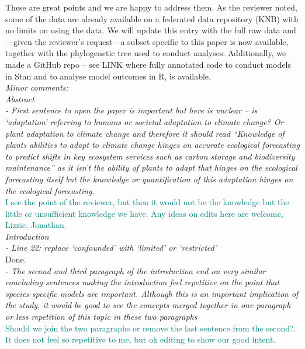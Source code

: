 \documentclass[11pt]{article}
\begin{document}

These are great points and we are happy to address them. As the reviewer noted, some of the data are already available on a federated data repository (KNB) with no limits on using the data. We will update this entry with the full raw data and---given the reviewer's request---a subset specific to this paper is now available, together with the phylogenetic tree used to conduct analyses. Additionally, we made a GitHub repo -- see LINK%
where fully annotated code to conduct models in Stan and to analyse model outcomes in R, is available.\\

\emph{Minor comments:}\\

\emph{Abstract}\\
\emph{- First sentence to open the paper is important but here is unclear – is ‘adaptation’ referring to humans or societal adaptation to climate change? Or plant adaptation to climate change and therefore it should read “Knowledge of plants abilities to adapt to climate change hinges on accurate ecological forecasting to predict shifts in key ecosystem services such as carbon storage and biodiversity maintenance” as it isn’t the ability of plants to adapt that hinges on the ecological forecasting itself but the knowledge or quantification of this adaptation hinges on the ecological forecasting.}\\
\textcolor{teal}{I see the point of the reviewer, but then it would not be the knowledge but the little or unsufficient knowledge we have. Any ideas on edits here are welcome, Lizzie, Jonathan.}\\


\emph{Introduction}\\
\emph{- Line 22: replace ‘confounded’ with ‘limited’ or ‘restricted’}\\
Done.\\

\emph{- The second and third paragraph of the introduction end on very similar concluding sentences making the introduction feel repetitive on the point that species-specific models are important. Although this is an important implication of the study, it would be good to see the concepts merged together in one paragraph or less repetition of this topic in these two paragraphs}\\
\textcolor{teal}{Should we join the two paragraphs or remove the last sentence from the second?. It does not feel so repetitive to me, but ok editing to show our good intent.}\\
\end{document}
